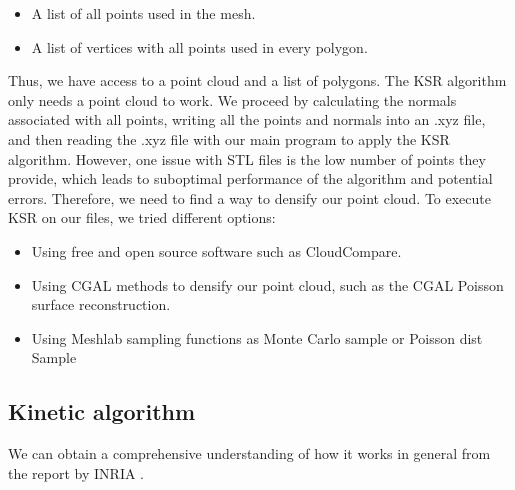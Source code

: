 \documentclass{article}
\begin{document}
\begin{itemize}
  \item A list of all points used in the mesh.
  \item A list of vertices with all points used in every polygon.
\end{itemize}

Thus, we have access to a point cloud and a list of polygons. The KSR algorithm only needs a point cloud to work. We proceed by calculating the normals associated with all points, 
writing all the points and normals into an .xyz file, and then reading the .xyz file with our main program to apply the KSR algorithm.
However, one issue with STL files is the low number of points they provide, which leads to suboptimal performance of the algorithm and potential errors. Therefore, we need to find a way to densify our point cloud.
To execute KSR on our files, we tried different options:

\begin{itemize}
  \item Using free and open source software such as CloudCompare.
  \item Using CGAL methods to densify our point cloud, such as the CGAL Poisson surface reconstruction.
  \item Using Meshlab sampling functions as Monte Carlo sample or Poisson dist Sample
\end{itemize}


\subsection{Kinetic algorithm}
\label{subsec:Kinetic algorithm}
We can obtain a comprehensive understanding of how it works in general from the report by INRIA \cite{yu:hal-03621896}.
\end{document}
